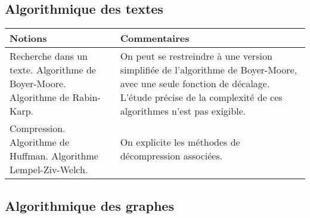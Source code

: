 \subsection{Algorithmique des textes \semDeux}


\noindent
\begin{longtable}{|p{\lnotion}|p{\comment}|}
    \hline
    \textbf{Notions} & \textbf{Commentaires} \\
    \hline \hline
    Recherche dans un texte. Algorithme de Boyer-Moore. Algorithme de Rabin-Karp. &
    On peut se restreindre à une version simplifiée de l'algorithme de Boyer-Moore, avec une seule fonction de décalage. L'étude précise de la complexité de ces algorithmes n'est pas exigible.
    \\ \hline
    Compression. Algorithme de Huffman. Algorithme Lempel-Ziv-Welch. &
    On explicite les méthodes de décompression associées.
    \\
    \hline
\end{longtable}




\subsection{Algorithmique des graphes \semDeux \semTroisQuatre}

